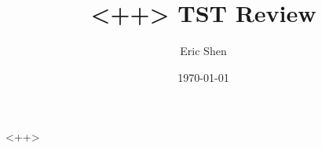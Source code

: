 \documentclass[8pt,ignorenonframetext,xcolor=dvipsnames]{beamer}
\title{<++> TST Review}
\date{\today}
\institute{Miller Mathcounts <++>}
\author{Eric Shen}
\begin{document}
\frame{\titlepage}

<++>
\end{document}
